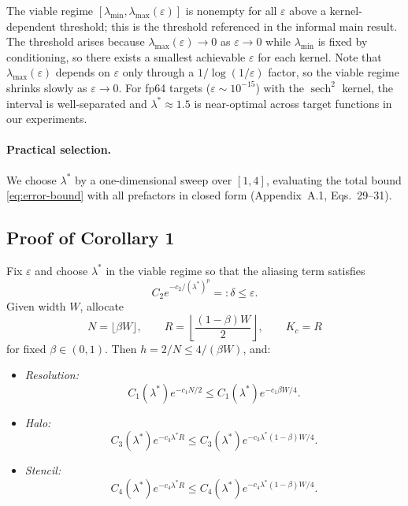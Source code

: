 \documentclass{article}
\begin{document}
The viable regime \([\lambda_{\min}, \lambda_{\max}(\varepsilon)]\) is nonempty for all \(\varepsilon\) above a kernel-dependent threshold; this is the threshold referenced in the informal main result. The threshold arises because \(\lambda_{\max}(\varepsilon) \to 0\) as \(\varepsilon \to 0\) while \(\lambda_{\min}\) is fixed by conditioning, so there exists a smallest achievable \(\varepsilon\) for each kernel. Note that \(\lambda_{\max}(\varepsilon)\) depends on \(\varepsilon\) only through a \(1/\log(1/\varepsilon)\) factor, so the viable regime shrinks slowly as \(\varepsilon \to 0\). For fp64 targets (\(\varepsilon \sim 10^{-15}\)) with the \(\operatorname{sech}^2\) kernel, the interval is well-separated and \(\lambda^* \approx 1.5\) is near-optimal across target functions in our experiments.

\paragraph{Practical selection.}
We choose \(\lambda^*\) by a one-dimensional sweep over \([1,4]\), evaluating the total bound \eqref{eq:error-bound} with all prefactors in closed form (Appendix~A.1, Eqs.~29--31).

\subsection{Proof of Corollary 1}
\label{app:proof-cor1}

Fix \(\varepsilon\) and choose \(\lambda^*\) in the viable regime so that the aliasing term satisfies
\[
C_2 e^{-c_2/(\lambda^*)^p} =: \delta \leq \varepsilon.
\]
Given width \(W\), allocate
\[
N = \lfloor \beta W \rfloor,
\qquad
R = \left\lfloor \frac{(1-\beta)W}{2} \right\rfloor,
\qquad
K_c = R
\]
for fixed \(\beta \in (0,1)\). Then \(h = 2/N \le 4/(\beta W)\), and:
\begin{itemize}
    \item \emph{Resolution:}
    \[
    C_1(\lambda^*) e^{-c_1 N/2}
    \le
    C_1(\lambda^*) e^{-c_1 \beta W/4}.
    \]

    \item \emph{Halo:}
    \[
    C_3(\lambda^*) e^{-c_3 \lambda^* R}
    \le
    C_3(\lambda^*) e^{-c_3 \lambda^*(1-\beta)W/4}.
    \]

    \item \emph{Stencil:}
    \[
    C_4(\lambda^*) e^{-c_4 \lambda^* R}
    \le
    C_4(\lambda^*) e^{-c_4 \lambda^*(1-\beta)W/4}.
    \]
\end{itemize}
\end{document}
